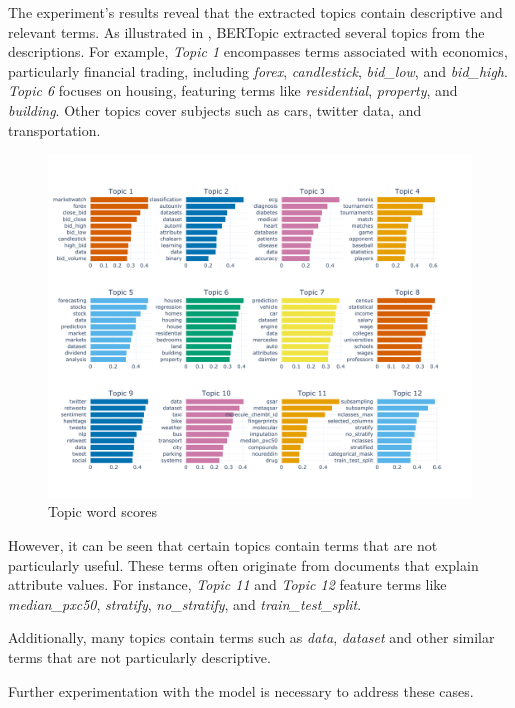 \documentclass{article}
\begin{document}
The experiment's results reveal that the extracted topics contain descriptive and relevant terms. As illustrated in , BERTopic extracted several topics from the descriptions. For example, \textit{Topic 1} encompasses terms associated with economics, particularly financial trading, including \textit{forex}, \textit{candlestick}, \textit{bid\_low}, and \textit{bid\_high}. \textit{Topic 6} focuses on housing, featuring terms like \textit{residential}, \textit{property}, and \textit{building}. Other topics cover subjects such as cars, twitter data, and transportation.

\begin{figure}[h] %
    \centering
    \includegraphics[width=\textwidth]{images/topics_barchart.pdf}
    \caption{Topic word scores}
    \label{fig:topics_barchart}
\end{figure}

However, it can be seen that certain topics contain terms that are not particularly useful. These terms often originate from documents that explain attribute values. For instance, \textit{Topic 11} and \textit{Topic 12} feature terms like \textit{median\_pxc50}, \textit{stratify}, \textit{no\_stratify}, and \textit{train\_test\_split}.

Additionally, many topics contain terms such as \textit{data}, \textit{dataset} and other similar terms that are not particularly descriptive.

Further experimentation with the model is necessary to address these cases.
\end{document}
